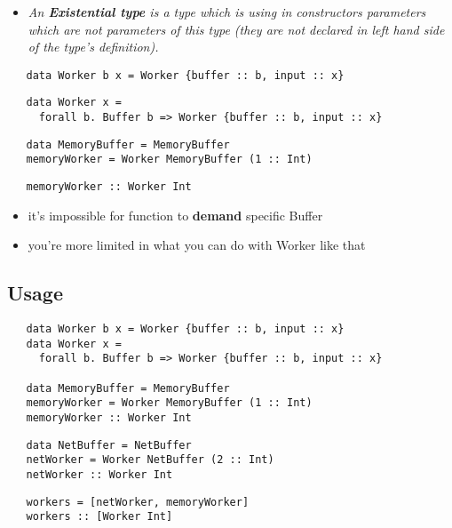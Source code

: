 \documentclass[aspectratio=43]{beamer}
\begin{document}
\begin{frame}[fragile]
  \begin{itemize}
   \item \textit{An \textbf{Existential type} is a type which is using in constructors parameters which are not parameters of this type (they are not declared in left hand side of the type's definition).}
  \end{itemize}
  \pause
  \begin{lstlisting}
   data Worker b x = Worker {buffer :: b, input :: x}
  \end{lstlisting}
  \pause
  \begin{lstlisting}
   data Worker x =
     forall b. Buffer b => Worker {buffer :: b, input :: x}
  \end{lstlisting}
  \pause
  \begin{lstlisting}
   data MemoryBuffer = MemoryBuffer
   memoryWorker = Worker MemoryBuffer (1 :: Int)
  \end{lstlisting}
  \pause
  \begin{lstlisting}
   memoryWorker :: Worker Int
  \end{lstlisting}
  \pause
  \begin{itemize}
   \item it's impossible for function to \textbf{demand} specific Buffer
   \item you're more limited in what you can do with Worker like that
  \end{itemize}
\end{frame}

\subsection{Usage}

\begin{frame}[fragile]
  \begin{lstlisting}
   data Worker b x = Worker {buffer :: b, input :: x}
   data Worker x =
     forall b. Buffer b => Worker {buffer :: b, input :: x}
   
   data MemoryBuffer = MemoryBuffer
   memoryWorker = Worker MemoryBuffer (1 :: Int)
   memoryWorker :: Worker Int
  \end{lstlisting}
  \pause
  \begin{lstlisting}
   data NetBuffer = NetBuffer
   netWorker = Worker NetBuffer (2 :: Int)
   netWorker :: Worker Int
  \end{lstlisting}
  \pause
  \begin{lstlisting}
   workers = [netWorker, memoryWorker]
   workers :: [Worker Int]
  \end{lstlisting}
\end{frame}
\end{document}
